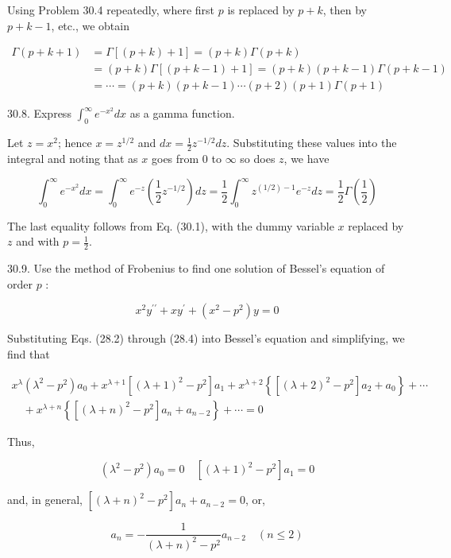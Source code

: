 \documentclass[10pt]{article}
\begin{document}
Using Problem 30.4 repeatedly, where first $p$ is replaced by $p+k$, then by $p+k-1$, etc., we obtain

$$
\begin{aligned}
\Gamma(p+k+1) & =\Gamma[(p+k)+1]=(p+k) \Gamma(p+k) \\
& =(p+k) \Gamma[(p+k-1)+1]=(p+k)(p+k-1) \Gamma(p+k-1) \\
& =\cdots=(p+k)(p+k-1) \cdots(p+2)(p+1) \Gamma(p+1)
\end{aligned}
$$

30.8. Express $\int_{0}^{\infty} e^{-x^{2}} d x$ as a gamma function.

Let $z=x^{2}$; hence $x=z^{1 / 2}$ and $d x=\frac{1}{2} z^{-1 / 2} d z$. Substituting these values into the integral and noting that as $x$ goes from 0 to $\infty$ so does $z$, we have

$$
\int_{0}^{\infty} e^{-x^{2}} d x=\int_{0}^{\infty} e^{-z}\left(\frac{1}{2} z^{-1 / 2}\right) d z=\frac{1}{2} \int_{0}^{\infty} z^{(1 / 2)-1} e^{-z} d z=\frac{1}{2} \Gamma\left(\frac{1}{2}\right)
$$

The last equality follows from Eq. (30.1), with the dummy variable $x$ replaced by $z$ and with $p=\frac{1}{2}$.

30.9. Use the method of Frobenius to find one solution of Bessel's equation of order $p$ :

$$
x^{2} y^{\prime \prime}+x y^{\prime}+\left(x^{2}-p^{2}\right) y=0
$$

Substituting Eqs. (28.2) through (28.4) into Bessel's equation and simplifying, we find that

$$
\begin{gathered}
x^{\lambda}\left(\lambda^{2}-p^{2}\right) a_{0}+x^{\lambda+1}\left[(\lambda+1)^{2}-p^{2}\right] a_{1}+x^{\lambda+2}\left\{\left[(\lambda+2)^{2}-p^{2}\right] a_{2}+a_{0}\right\}+\cdots \\
\quad+x^{\lambda+n}\left\{\left[(\lambda+n)^{2}-p^{2}\right] a_{n}+a_{n-2}\right\}+\cdots=0
\end{gathered}
$$

Thus,


\begin{equation*}
\left(\lambda^{2}-p^{2}\right) a_{0}=0 \quad\left[(\lambda+1)^{2}-p^{2}\right] a_{1}=0 \tag{1}
\end{equation*}


and, in general, $\left[(\lambda+n)^{2}-p^{2}\right] a_{n}+a_{n-2}=0$, or,


\begin{equation*}
a_{n}=-\frac{1}{(\lambda+n)^{2}-p^{2}} a_{n-2} \quad(n \leq 2) \tag{2}
\end{equation*}
\end{document}
